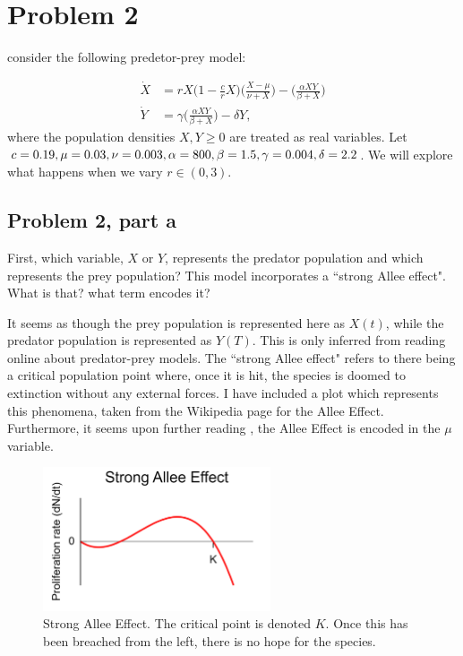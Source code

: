 \newpage
\section{Problem 2}
consider the following predetor-prey model:

\begin{align*}
    \dot{X} &= rX\bigg(1 - \frac{c}{r}X\bigg)\bigg(\frac{X - \mu}{\nu + X}\bigg) - \bigg(\frac{\alpha XY}{\beta + X}\bigg)\\
    \dot{Y} &= \gamma \bigg( \frac{\alpha XY}{\beta + X}\bigg) - \delta Y,
\end{align*}
where the population densities $X, Y \geq 0$ are treated as real variables. Let $c = 0.19, \mu = 0.03, \nu = 0.003, \newline  \alpha = 800, \beta = 1.5, \gamma = 0.004, \delta = 2.2$. We will explore what happens when we vary $r \in (0, 3).$

\subsection{Problem 2, part a}
First, which variable, $X$ or $Y$, represents the predator population and which represents the prey population? This model incorporates a ``strong Allee effect". What is that? what term encodes it?
\partbreak
\begin{solution}

    It seems as though the prey population is represented here as $X(t)$, while the predator population is represented as $Y(T)$. This is only inferred from reading online about predator-prey models. The ``strong Allee effect" refers to there being a critical population point where, once it is hit, the species is doomed to extinction without any external forces. I have included a plot which represents this phenomena, taken from the Wikipedia page for the Allee Effect. Furthermore, it seems upon further reading \cite{ye2019dynamic}, the Allee Effect is encoded in the $\mu$ variable.

\begin{figure}[ht]
    \centering
    \includegraphics[width = 0.6\textwidth, frame]{Images/Strong Allee Effect.png}
    \caption{Strong Allee Effect. The critical point is denoted $K$. Once this has been breached from the left, there is no hope for the species.}
    \label{fig:p2a strong allee effect}
\end{figure}
\end{solution}

